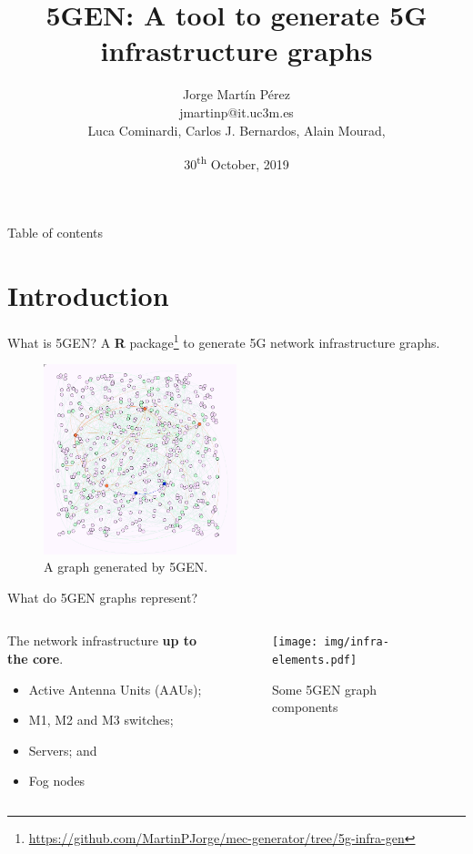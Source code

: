 \documentclass{beamer}
\title{5GEN: A tool to generate 5G infrastructure graphs}
\date{30\textsuperscript{th} October, 2019}
\author{Jorge Martín Pérez\\jmartinp@it.uc3m.es\\\vspace{1em}Luca Cominardi, Carlos J. Bernardos, Alain Mourad, }
\begin{document}
\begin{frame}
\titlepage
\end{frame}

\setcounter{framenumber}{0}


\begin{frame}{Table of contents}
    \tableofcontents
\end{frame}

\section{Introduction}
\begin{frame}{What is 5GEN?}
     A \textbf{R} package\footnote{\scriptsize \url{https://github.com/MartinPJorge/mec-generator/tree/5g-infra-gen}} to generate 5G network infrastructure graphs.

    \begin{figure}
        \includegraphics[width=0.5\textwidth]{img/infra-graphs.png}
        \caption{A graph generated by 5GEN.}
        \label{fig:5gen-graph}
    \end{figure}
\end{frame}



\begin{frame}{What do 5GEN graphs represent?}
    \begin{columns}[T]
        \begin{column}{.48\textwidth}
            \vspace{2.5em}
            The network infrastructure \textbf{up to the core}.
            \begin{itemize}
                \item Active Antenna Units (AAUs);
                \item M1, M2 and M3 switches;
                \item Servers; and
                \item Fog nodes
            \end{itemize}
        \end{column}
        \begin{column}{.48\textwidth}
            \begin{figure}
                \texttt{[image: img/infra-elements.pdf]}
                \caption{Some 5GEN graph components}
            \end{figure}
        \end{column}
    \end{columns}
\end{frame}
\end{document}
